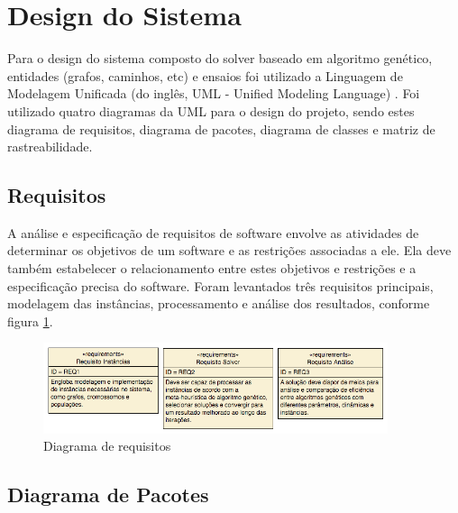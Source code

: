 \documentclass[12pt]{elsarticle}
\begin{document}
    
    
    \section{Design do Sistema}
    
    Para o design do sistema composto do solver baseado em algoritmo genético, entidades (grafos, caminhos, etc) e ensaios foi utilizado a Linguagem de Modelagem Unificada (do inglês, UML - Unified Modeling Language) \cite{uml}. Foi utilizado quatro diagramas da UML para o design do projeto, sendo estes diagrama de requisitos, diagrama de pacotes, diagrama de classes e matriz de rastreabilidade.
    
    \subsection{Requisitos}
    
    A análise e especificação de requisitos de software envolve as atividades de determinar os objetivos de um software e as restrições associadas a ele. Ela deve também estabelecer o relacionamento entre estes objetivos e restrições e a especificação precisa do software\cite{leite}. Foram levantados três requisitos principais, modelagem das instâncias, processamento e análise dos resultados, conforme figura \ref{fig:UMLReq}.
    
\begin{figure}[H]
\centering
\includegraphics[width=0.9\textwidth]{UMLReq.png}
\vspace{0.5cm}
\caption{\label{fig:UMLReq}Diagrama de requisitos}
\end{figure}
    
    \subsection{Diagrama de Pacotes}
    
\end{document}
